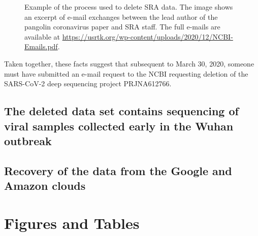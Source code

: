 \documentclass[9pt,twocolumn,twoside]{gsajnl_modified}
\begin{document}
\begin{figure}[]
\centering
{}
\caption{Example of the process used to delete SRA data.
The image shows an excerpt of e-mail exchanges between the lead author of the pangolin coronavirus paper \citet{xiao2020isolation} and SRA staff.
The full e-mails are available at \url{https://usrtk.org/wp-content/uploads/2020/12/NCBI-Emails.pdf}.
}
\label{fig:pangolin_emails}
\end{figure}

Taken together, these facts suggest that subsequent to March 30, 2020, someone must have submitted an e-mail request to the NCBI requesting deletion of the SARS-CoV-2 deep sequencing project PRJNA612766.

\subsection{The deleted data set contains sequencing of viral samples collected early in the Wuhan outbreak}

\subsection{Recovery of the data from the Google and Amazon clouds} 

\section{Figures and Tables}
\end{document}
